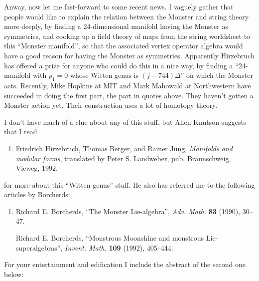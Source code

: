\documentclass{article}
\def\tightlist{}
\begin{document}
Anway, now let me fast-forward to some recent news. I vaguely gather
that people would like to explain the relation between the Monster and
string theory more deeply, by finding a 24-dimensional manifold having
the Monster as symmetries, and cooking up a field theory of maps from
the string worldsheet to this ``Monster manifold'', so that the
associated vertex operator algebra would have a good reason for having
the Monster as symmetries. Apparently Hirzebruch has offered a prize for
anyone who could do this in a nice way, by finding a ``24-manifold with
\(p_1=0\) whose Witten genus is \((j-744)\Delta\)'' on which the Monster
acts. Recently, Mike Hopkins at MIT and Mark Mahowald at Northwestern
have succeeded in doing the first part, the part in quotes above. They
haven't gotten a Monster action yet. Their construction uses a lot of
homotopy theory.

I don't have much of a clue about any of this stuff, but Allen Knutson
suggests that I read

\begin{enumerate}
\def\labelenumi{\arabic{enumi})}
\setcounter{enumi}{5}
\tightlist
\item
  Friedrich Hirzebruch, Thomas Berger, and Rainer Jung, \emph{Manifolds
  and modular forms}, translated by Peter S. Landweber, pub.
  Braunschweig, Vieweg, 1992.
\end{enumerate}

for more about this ``Witten genus'' stuff. He also has referred me to
the following articles by Borcherds:

\begin{enumerate}
\def\labelenumi{\arabic{enumi})}
\setcounter{enumi}{6}
\item
  Richard E. Borcherds, ``The Monster Lie-algebra'', \emph{Adv. Math.}
  \textbf{83} (1990), 30--47.

  Richard E. Borcherds, ``Monstrous Moonshine and monstrous
  Lie-superalgebras'', \emph{Invent. Math.} \textbf{109} (1992),
  405--444.
\end{enumerate}

For your entertainment and edification I include the abstract of the
second one below:
\end{document}

